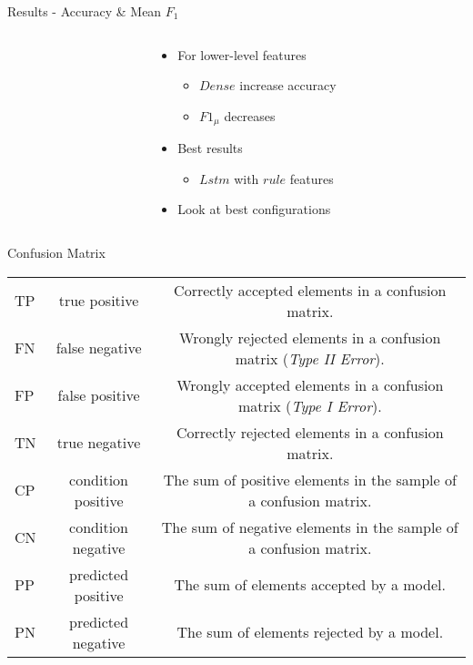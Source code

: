 \begin{frame}{Results - Accuracy \& Mean \(F_1\)}
  \begin{columns}[T] %
    \begin{column}{.55\textwidth}
      \resizebox{1.\textwidth}{!}{%
        \small
        
      }
    \end{column}%
    \begin{column}{.45\textwidth}
      \small
      \vspace{20pt}
      \begin{itemize}[label=-]
        \item<2-> For lower-level features
      \begin{itemize}[label=-]
        \item<2-> \(Dense\) increase accuracy
        \item<3-> \(F1_\mu\) decreases
      \end{itemize}
        \item<4-> Best results
      \begin{itemize}[label=-]
        \item<4-> \(Lstm\) with \(rule\) features
      \end{itemize}
      \end{itemize}
      \vspace{10pt}
      \begin{itemize}[label=-]
        \item<5->[\(\rightarrow\)] Look at best configurations
      \end{itemize}
    \end{column}%
  \end{columns}
\end{frame}
\begin{frame}{Confusion Matrix}
  \begin{tabulary}{\textwidth}{ l C C }
    TP  & true positive             & Correctly accepted elements in a \gls{confusion matrix}. \\
     FN  & false negative            & Wrongly rejected elements in a \gls{confusion matrix} (\emph{Type II Error}). \\
     FP  & false positive            & Wrongly accepted elements in a \gls{confusion matrix} (\emph{Type I Error}). \\
     TN  & true negative             & Correctly rejected elements in a \gls{confusion matrix}. \\
     CP  & condition positive        & The sum of positive elements in the sample of a \gls{confusion matrix}. \\
     CN  & condition negative        & The sum of negative elements in the sample of a \gls{confusion matrix}. \\
     PP  & predicted positive        & The sum of elements accepted by a model. \\
     PN  & predicted negative        & The sum of elements rejected by a model. \\
  \end{tabulary}
\end{frame}
